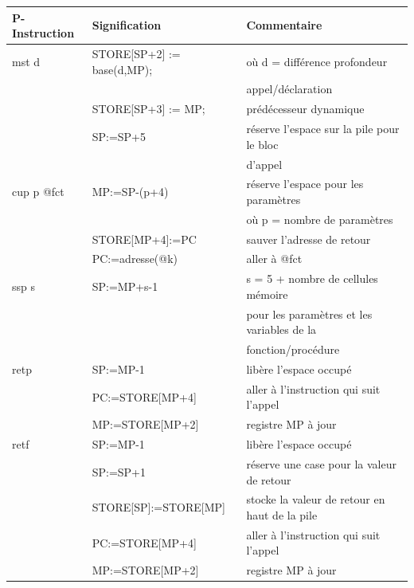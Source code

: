 \documentclass[french,11pt,twoside]{article}
\begin{document}
\begin{tabular}{|l|l|l|}
\hline
P-Instruction & Signification                            & Commentaire \\
\hline
mst d 	        & STORE[SP+2] := base(d,MP);      & où d = différence profondeur \\
                    &                                                  & appel/déclaration \\
      	            & STORE[SP+3] := MP;         	      & prédécesseur dynamique\\
			        & SP:=SP+5						     	      & réserve l'espace sur la pile pour le bloc \\
			        &                                                  & d'appel\\
\hline
cup p @fct   & MP:=SP-(p+4)						      & réserve l'espace pour les paramètres \\
                    &                                                  & o\`u p = nombre de paramètres\\
			        & STORE[MP+4]:=PC					  & sauver l'adresse de retour\\
			        & PC:=adresse(@k)			              & aller à @fct\\
\hline
ssp s            & SP:=MP+s-1			                      & s = 5 + nombre de cellules mémoire \\
		            &                                                  & pour les paramètres et les variables de la \\
                    &                                                  & fonction/procédure \\
\hline
retp            	& SP:=MP-1							           & libère l'espace occupé\\
		            & PC:=STORE[MP+4]					   & aller à l'instruction qui suit l'appel\\
		            & MP:=STORE[MP+2]					   & registre MP à jour\\
\hline
retf            	& SP:=MP-1							           & libère l'espace occupé\\
                 	& SP:=SP+1							           & réserve une case pour la valeur de retour\\
                 	& STORE[SP]:=STORE[MP]		           & stocke la valeur de retour en haut de la pile\\
		            & PC:=STORE[MP+4]					   & aller à l'instruction qui suit l'appel\\
		            & MP:=STORE[MP+2]					   & registre MP à jour\\		            
\hline
\end{tabular}
\end{document}
